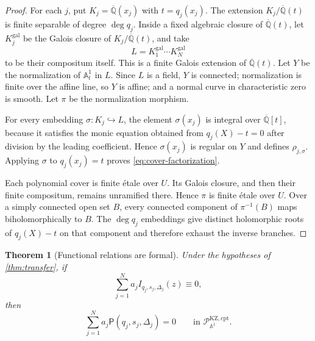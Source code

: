 \documentclass[11pt]{article}
\numberwithin{equation}{section}
\newtheorem{theorem}{Theorem}[section]
\theoremstyle{definition}
\theoremstyle{remark}
\newcommand{\Qbar}{\overline{\mathbb Q}}
\newcommand{\Aone}{\mathbb A^1}
\newcommand{\Pcal}{\mathcal P}
\begin{document}
\begin{proof}
For each $j$, put $K_j=\Qbar(x_j)$ with $t=q_j(x_j)$.  The extension
$K_j/\Qbar(t)$ is finite separable of degree $\deg q_j$.  Inside a fixed algebraic closure of $\Qbar(t)$, let
$K_j^{\mathrm{gal}}$ be the Galois closure of $K_j/\Qbar(t)$, and take
\[
  L=K_1^{\mathrm{gal}}\cdots K_N^{\mathrm{gal}}
\]
to be their compositum itself.  This is a finite Galois extension of
$\Qbar(t)$.  Let $Y$ be the normalization of $\Aone_t$ in $L$.  Since $L$ is a field, $Y$ is connected; normalization
is finite over the affine line, so $Y$ is affine; and a normal curve in
characteristic zero is smooth.  Let $\pi$ be the normalization morphism.

For every embedding $\sigma:K_j\hookrightarrow L$, the element
$\sigma(x_j)$ is integral over $\Qbar[t]$, because it satisfies the monic
equation obtained from $q_j(X)-t=0$ after division by the leading
coefficient.  Hence $\sigma(x_j)$ is regular on $Y$ and defines
$\rho_{j,\sigma}$.  Applying $\sigma$ to $q_j(x_j)=t$ proves
\eqref{eq:cover-factorization}.

Each polynomial cover is finite \'{e}tale over $U$.  Its Galois closure, and
then their finite compositum, remains unramified there.  Hence $\pi$ is
finite \'{e}tale over $U$.  Over a simply connected open set $B$, every
connected component of $\pi^{-1}(B)$ maps biholomorphically to $B$.  The
$\deg q_j$ embeddings give distinct holomorphic roots of $q_j(X)-t$ on
that component and therefore exhaust the inverse branches.
\end{proof}

\begin{theorem}[Functional relations are formal]
\label{thm:functional-relations-formal}
Under the hypotheses of \cref{thm:transfer}, if
\[
  \sum_{j=1}^{N}a_jI_{q_j,s_j,\Delta_j}(z)\equiv0,
\]
then
\begin{equation}\label{eq:formal-functional-relation}
  \sum_{j=1}^{N}a_j\mathsf P(q_j,s_j,\Delta_j)=0
  \qquad\text{in }\Pcal_{\Aone}^{\mathrm{KZ,cpt}}.
\end{equation}
\end{theorem}
\end{document}
